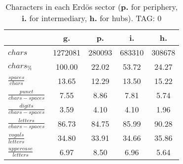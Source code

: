 \begin{table}[h!]
\begin{center}
\begin{tabular}{| l || c | c | c | c |}\hline
 & {\bf g.} & {\bf p.} & {\bf i.} & {\bf h.} \\\hline\hline
$chars$ & 1272081  & 280093  & 683310  & 308678 \\
$chars_{\%}$ & 100.00  & 22.02  & 53.72  & 24.27 \\\hline
$\frac{spaces}{chars}$ & 13.65  & 12.29  & 13.50  & 15.22 \\
$\frac{punct}{chars-spaces}$ & 7.55  & 8.86  & 7.81  & 5.74 \\
$\frac{digits}{chars-spaces}$ & 3.59  & 4.10  & 4.10  & 1.96 \\\hline
$\frac{letters}{chars-spaces}$ & 86.73  & 84.75  & 85.99  & 90.28 \\
$\frac{vogals}{letters}$ & 34.80  & 33.91  & 34.66  & 35.86 \\
$\frac{uppercase}{letters}$ & 6.97  & 8.50  & 6.96  & 5.64 \\\hline
\end{tabular}
\caption{Characters in each Erd\"os sector ({{\bf p.}} for periphery, {{\bf i.}} for intermediary, 
    {{\bf h.}} for hubs). TAG: 0}
\end{center}
\end{table}
